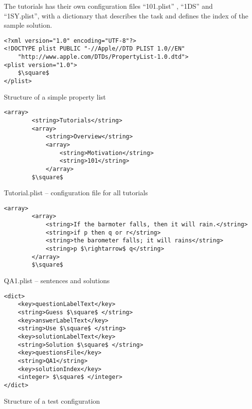 The tutorials has their own configuration files “101.plist” ,
 “1DS” and  “1SY.plist”, with a dictionary that
 describes the task and defines the index of the sample solution.




\begin{table}[htdp]
\begin{center}
\begin{lstlisting}[mathescape]
<?xml version="1.0" encoding="UTF-8"?>
<!DOCTYPE plist PUBLIC "-//Apple//DTD PLIST 1.0//EN" 
	"http://www.apple.com/DTDs/PropertyList-1.0.dtd">
<plist version="1.0">
	$\square$	
</plist>
\end{lstlisting}
\caption{Structure of a simple property list }
\end{center}
\label{tab:PLISTHEAD}
\end{table}%

\begin{table}[htdp]
\begin{center}
\begin{lstlisting}[mathescape,firstnumber=5]
	<array>
		<string>Tutorials</string>
		<array>
			<string>Overview</string>
			<array>
				<string>Motivation</string>
				<string>101</string>
			</array>
		$\square$
\end{lstlisting}
\caption{Tutorial.plist – configuration file for all tutorials}
\end{center}
\label{tab:TUTORIALPLIST}
\end{table}%


\begin{table}[htdp]
\begin{center}
\begin{lstlisting}[mathescape,firstnumber=5]
	<array>
		<array> 
			<string>If the barmoter falls, then it will rain.</string>
			<string>if p then q or r</string>
			<string>the barometer falls; it will rains</string>
			<string>p $\rightarrow$ q</string>
		</array>
		$\square$
\end{lstlisting}
\caption{QA1.plist – sentences and solutions}
\end{center}
\label{tab:QA1}
\end{table}%

\begin{table}[htdp]
\begin{center}
\begin{lstlisting}[mathescape,firstnumber=5]
<dict>
	<key>questionLabelText</key>
	<string>Guess $\square$ </string>
	<key>answerLabelText</key>
 	<string>Use $\square$ </string>
 	<key>solutionLabelText</key>
 	<string>Solution $\square$ </string>
 	<key>questionsFile</key>
 	<string>QA1</string>
 	<key>solutionIndex</key>
 	<integer> $\square$ </integer>
</dict>
\end{lstlisting}
\caption{Structure of a test configuration}
\end{center}
\label{tab:101PLIST}
\end{table}%


